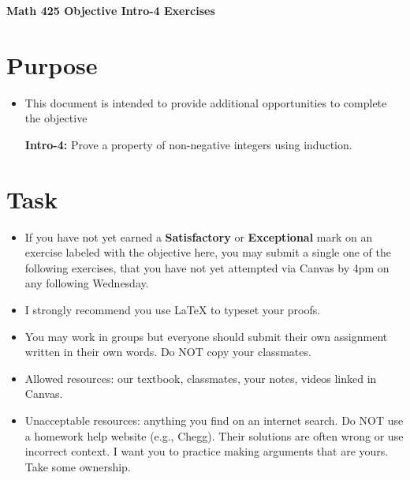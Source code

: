 \documentclass[12pt]{article}
\begin{document}
	\begin{center}
		{\Large \bf Math 425 Objective Intro-4 Exercises}
	\end{center}
	\section*{Purpose}
	\begin{itemize}
		\item This document is intended to provide additional opportunities to complete the objective
		
		\textbf{Intro-4:} Prove a property of non-negative integers using induction.
	\end{itemize}
	\section*{Task}
	\begin{itemize}
		\item If you have not yet earned a \textbf{Satisfactory} or \textbf{Exceptional} mark on an exercise labeled with the objective here, you may submit a single one of the following exercises, that you have not yet attempted via Canvas by 4pm on any following Wednesday.
		\item I strongly recommend you use LaTeX to typeset your proofs.
		\item You may work in groups but everyone should submit their own assignment written in their own words.  Do NOT copy your classmates.
		\item Allowed resources: our textbook, classmates, your notes, videos linked in Canvas.
		\item Unacceptable resources: anything you find on an internet search. Do NOT use a homework help website (e.g., Chegg). Their solutions are often wrong or use incorrect context.  I want you to practice making arguments that are yours. Take some ownership.
	\end{itemize}
\end{document}
